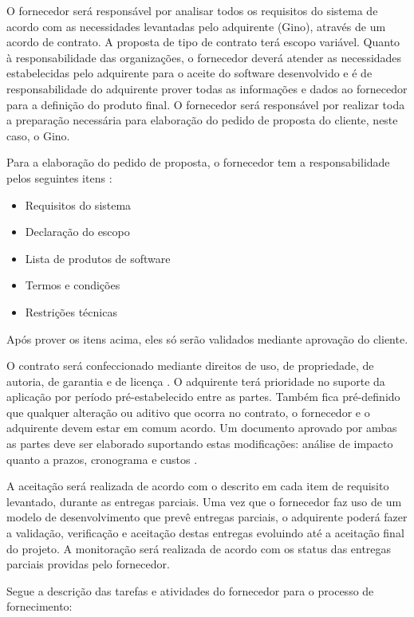 O fornecedor será responsável por analisar todos os requisitos do sistema de acordo com as necessidades levantadas pelo adquirente (Gino), através de um acordo de contrato. A proposta de tipo de contrato terá escopo variável. Quanto à responsabilidade das organizações, o fornecedor deverá atender as necessidades estabelecidas pelo adquirente para o aceite do software desenvolvido e é de responsabilidade do adquirente prover todas as informações e dados ao fornecedor para a definição do produto final.
O fornecedor será responsável por realizar toda a preparação necessária para elaboração do pedido de proposta do cliente, neste caso, o Gino.

Para a elaboração do pedido de proposta, o fornecedor tem a responsabilidade pelos seguintes itens \cite{iso12207:95}:
\begin{itemize}
  \item Requisitos do sistema
  \item Declaração do escopo
  \item Lista de produtos de software
  \item Termos e condições
  \item Restrições técnicas
\end{itemize}

Após prover os itens acima, eles só serão validados mediante aprovação do cliente.

O contrato será confeccionado mediante direitos de uso, de propriedade, de autoria, de garantia e de licença \cite{iso12207:95}. O adquirente terá prioridade no suporte da aplicação por período pré-estabelecido entre as partes. Também fica pré-definido que qualquer alteração ou aditivo que ocorra no contrato, o fornecedor e o adquirente devem estar em comum acordo. Um documento aprovado por ambas as partes deve ser elaborado suportando estas modificações: análise de impacto quanto a prazos, cronograma e custos \cite{iso12207:95}.

A aceitação será realizada de acordo com o descrito em cada item de requisito levantado, durante as entregas parciais. Uma vez que o fornecedor faz uso de um modelo de desenvolvimento que prevê entregas parciais, o adquirente poderá fazer a validação, verificação e aceitação destas entregas evoluindo até a aceitação final do projeto. A monitoração será realizada de acordo com os status das entregas parciais providas pelo fornecedor. 

Segue a descrição das tarefas e atividades do fornecedor para o processo de fornecimento:


